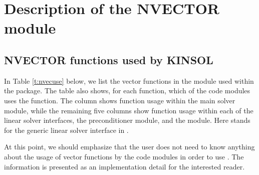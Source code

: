 \chapter{Description of the NVECTOR module}\label{s:nvector}



\section{NVECTOR functions used by KINSOL}

In Table \ref{t:nvecuse} below, we list the vector functions in the 
{\nvector} module used within the {\kinsol} package.
The table also shows, for each function, which of the code modules uses
the function. The {\kinsol} column shows function usage within the main
solver module, while the remaining five columns show function
usage within each of the {\kinsol} linear solver interfaces, 
the {\kinbbdpre} preconditioner module, and the {\fkinsol} module.
Here {\kinls} stands for the generic linear solver interface in {\kinsol}.

At this point, we should emphasize that the {\kinsol} user does not need to know 
anything about the usage of vector functions by the {\kinsol} code modules in order 
to use {\kinsol}. The information is presented as an implementation detail for the 
interested reader.

